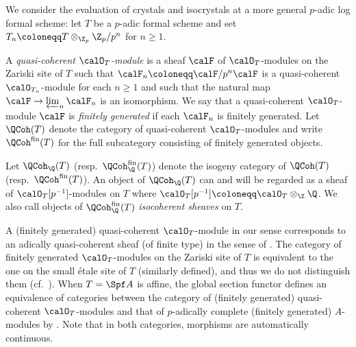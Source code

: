 We consider the evaluation of crystals and isocrystals at a more general $p$-adic log formal scheme: let $T$ be a $p$-adic formal scheme and set $T_n\coloneqq T\otimes_{\Z_p}\Z_p/p^n$ for $n\geq 1$. 

\begin{defn}
A \emph{quasi-coherent $\calO_T$-module} is a sheaf $\calF$ of $\calO_T$-modules on the Zariski site of $T$ such that $\calF_n\coloneqq \calF/p^n\calF$ is a quasi-coherent $\calO_{T_n}$-module for each $n\geq 1$ and such that the natural map $\calF\rightarrow \varprojlim_n\calF_n$ is an isomorphism. We say that a quasi-coherent $\calO_T$-module $\calF$ is \emph{finitely generated} if each $\calF_n$ is finitely generated.
Let $\QCoh(T)$ denote the category of quasi-coherent $\calO_T$-modules and write $\QCoh^{\mathrm{fin}}(T)$ for the full subcategory consisting of finitely generated objects.

Let $\QCoh_\Q(T)$ (resp.~$\QCoh^\mathrm{fin}_{\Q}(T)$) denote the isogeny category of $\QCoh(T)$ (resp.~$\QCoh^{\mathrm{fin}}(T)$). An object of $\QCoh_\Q(T)$ can and will be regarded as a sheaf of $\calO_T[p^{-1}]$-modules on $T$ where $\calO_T[p^{-1}]\coloneqq \calO_T\otimes_\Z\Q$. We also call objects of $\QCoh^{\mathrm{fin}}_{\Q}(T)$ \emph{isocoherent sheaves} on $T$.
\end{defn}

\begin{rem}
A (finitely generated) quasi-coherent $\calO_T$-module in our sense corresponds to an adically quasi-coherent sheaf (of finite type) in the sense of \cite[Def.~I.3.1.3]{fujiwara-kato}. The category of finitely generated $\calO_T$-modules on the Zariski site of $T$ is equivalent to the one on the small \'etale site of $T$ (similarly defined), and thus we do not distinguish them (cf.~\cite[Prop.~I.6.2.11]{fujiwara-kato}). When $T=\Spf A$ is affine, the global section functor defines an equivalence of categories between the category of (finitely generated) quasi-coherent $\calO_T$-modules and that of $p$-adically complete (finitely generated) $A$-modules by \cite[Thm.~I.3.2.8]{fujiwara-kato}. Note that in both categories, morphisms are automatically continuous. 
\end{rem}

